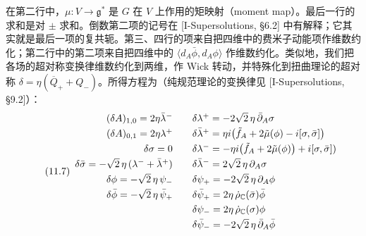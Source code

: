 
在第二行中，$\mu:V\to\mathfrak{g}^*$ 是 $G$ 在 $V$ 上作用的矩映射（moment map）。最后一行的求和是对 $\pm$ 求和。倒数第二项的记号在 [I-Supersolutions, §6.2] 中有解释；它其实就是最后一项的复共轭。第三、四行的项来自把四维中的费米子动能项作维数约化；第二行中的第二项来自把四维中的 $\langle d_A\bar\phi,d_A\phi\rangle$ 作维数约化。类似地，我们把各场的超对称变换律维数约化到两维，作 Wick 转动，并特殊化到扭曲理论的超对称 $\delta=\eta(\overline{Q}_++Q_-)$。所得方程为（纯规范理论的变换律见 [I-Supersolutions, §9.2]）：
\begin{equation}
  \tag{11.7}
  \label{eq:sol11-7}
  \begin{array}{r@{\qquad}l}
    (\delta A)_{1,0}=2\eta\bar\lambda^- & \delta\lambda^+=-2\sqrt2\,\eta\,\bar\partial_A\sigma\\[3pt]
    (\delta A)_{0,1}=2\eta\lambda^+ & \delta\bar\lambda^+=\eta i\bigl(\tilde f_A+2\tilde\mu(\phi)-i[\sigma,\bar\sigma]\bigr)\\[3pt]
    \delta\sigma=0 & \delta\lambda^-=-\eta i\bigl(\tilde f_A+2\tilde\mu(\phi)\bigr)+i[\sigma,\bar\sigma])\\[3pt]
    \delta\bar\sigma=-\sqrt2\,\eta\,(\lambda^-+\bar\lambda^+) & \delta\bar\lambda^-=2\sqrt2\,\eta\,\partial_A\sigma\\[3pt]
    \delta\phi=-\sqrt2\,\eta\,\psi_- & \delta\psi_+=-2\sqrt2\,\eta\,\partial_A\phi\\[3pt]
    \delta\bar\phi=-\sqrt2\,\eta\,\bar\psi_+ & \delta\bar\psi_+=2\eta\,\dot\rho_{\mathbb{C}}(\bar\sigma)\bar\phi\\[3pt]
    & \delta\psi_-=2\eta\,\dot\rho_{\mathbb{C}}(\sigma)\phi\\[3pt]
    & \delta\bar\psi_-=-2\sqrt2\,\eta\,\bar\partial_A\bar\phi
  \end{array}
\end{equation}


